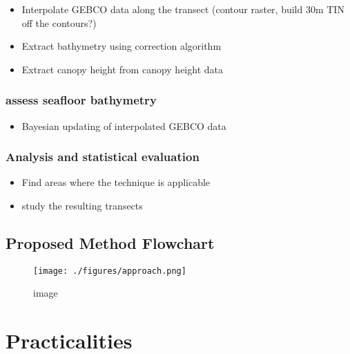 \begin{itemize}

  \item
        Interpolate GEBCO data along the transect (contour raster, build 30m
        TIN off the contours?)
  \item
        Extract bathymetry using correction algorithm
  \item
        Extract canopy height from canopy height data
\end{itemize}

\hypertarget{assess-seafloor-bathymetry}{%
  \subsection{assess seafloor
    bathymetry}\label{assess-seafloor-bathymetry}}

\begin{itemize}

  \item
        Bayesian updating of interpolated GEBCO data
\end{itemize}

\hypertarget{analysis-and-statistical-evaluation}{%
  \subsection{Analysis and statistical
    evaluation}\label{analysis-and-statistical-evaluation}}

\begin{itemize}

  \item
        Find areas where the technique is applicable
  \item
        study the resulting transects
\end{itemize}

\hypertarget{proposed-method-flowchart}{%
  \section{Proposed Method Flowchart}\label{proposed-method-flowchart}}

\begin{figure}
  \centering
  \texttt{[image: ./figures/approach.png]}
  \caption{image}
\end{figure}

\hypertarget{practicalities}{%
  \chapter{Practicalities}\label{practicalities}}

